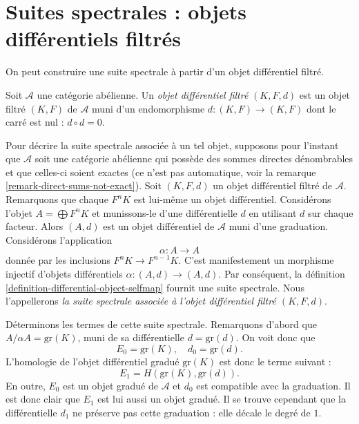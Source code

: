 \section{Suites spectrales : objets différentiels filtrés}
\label{section-filtered-differential}

\noindent
On peut construire une suite spectrale à partir d'un
objet différentiel filtré.

\begin{definition}
\label{definition-filtered-differential}
Soit $\mathcal{A}$ une catégorie abélienne.
Un {\it objet différentiel filtré} $(K, F, d)$ est un objet filtré
$(K, F)$ de $\mathcal{A}$ muni d'un endomorphisme
$d : (K, F) \to (K, F)$ dont le carré est nul : $d \circ d = 0$.
\end{definition}

\noindent
Pour décrire la suite spectrale associée à un tel objet,
supposons pour l'instant que $\mathcal{A}$ soit une catégorie abélienne
qui possède des sommes directes dénombrables et que celles-ci soient exactes
(ce n'est pas automatique, voir la remarque \ref{remark-direct-sums-not-exact}).
Soit $(K, F, d)$ un objet différentiel filtré de $\mathcal{A}$.
Remarquons que chaque $F^nK$ est lui-même un objet différentiel.
Considérons l'objet $A = \bigoplus F^nK$ et munissons-le d'une
différentielle $d$ en utilisant $d$ sur chaque facteur.
Alors $(A, d)$ est un objet différentiel de $\mathcal{A}$
muni d'une graduation. Considérons l'application
$$
\alpha : A \to A
$$
donnée par les inclusions $F^nK \to F^{n - 1}K$.
C'est manifestement un morphisme injectif d'objets différentiels
$\alpha : (A, d) \to (A, d)$. Par conséquent, la
définition \ref{definition-differential-object-selfmap}
fournit une suite spectrale.
Nous l'appellerons {\it la suite spectrale associée à
l'objet différentiel filtré $(K, F, d)$}.

\medskip\noindent
Déterminons les termes de cette suite spectrale.
Remarquons d'abord que $A/\alpha A = \text{gr}(K)$,
muni de sa différentielle $d = \text{gr}(d)$. On voit donc que
$$
E_0 = \text{gr}(K), \quad d_0 = \text{gr}(d).
$$
L'homologie de l'objet différentiel gradué $\text{gr}(K)$
est donc le terme suivant :
$$
E_1 = H(\text{gr}(K), \text{gr}(d)).
$$
En outre, $E_0$ est un objet gradué de $\mathcal{A}$
et $d_0$ est compatible avec la graduation. Il est donc clair que $E_1$
est lui aussi un objet gradué. Il se trouve cependant que la différentielle
$d_1$ ne préserve pas cette graduation : elle décale le degré de $1$.

